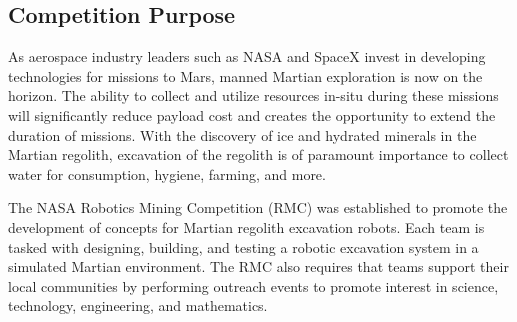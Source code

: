 \documentclass[class=article, crop=false]{standalone}
\begin{document}
	\subsection{Competition Purpose}
	\label{subsec:competition_purpose}
	
	
As aerospace industry leaders such as NASA and SpaceX invest in developing technologies for missions to Mars, manned Martian exploration is now on the horizon. The ability to collect and utilize resources in-situ during these missions will significantly reduce payload cost and creates the opportunity to extend the duration of missions. With the discovery of ice and hydrated minerals in the Martian regolith, excavation of the regolith is of paramount importance to collect water for consumption, hygiene, farming, and more.


The NASA Robotics Mining Competition (RMC) was established to promote the development of concepts for Martian regolith excavation robots. Each team is tasked with designing, building, and testing a robotic excavation system in a simulated Martian environment. The RMC also requires that teams support their local communities by performing outreach events to promote interest in science, technology, engineering, and mathematics.

	
	
	
\end{document}
